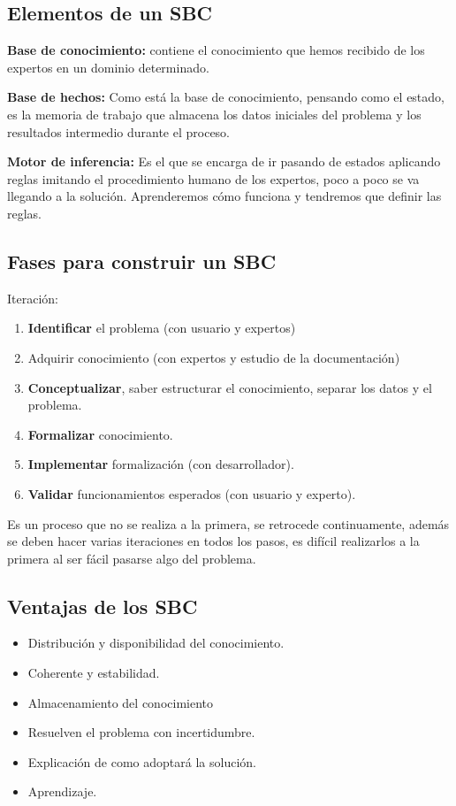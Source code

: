 \documentclass[12pt, twoside, openright]{report} %
\begin{document}
\subsection{Elementos de un SBC}
\textbf{Base de conocimiento:} contiene el conocimiento que hemos recibido de los expertos en un dominio determinado.

\textbf{Base de hechos:} Como está la base de conocimiento, pensando como el estado, es la memoria de trabajo que almacena los datos iniciales del problema y los resultados intermedio durante el proceso.

\textbf{Motor de inferencia:} Es el que se encarga de ir pasando de estados aplicando reglas imitando el procedimiento humano de los expertos, poco a poco se va llegando a la solución. Aprenderemos cómo funciona y tendremos que definir las reglas.
\begin{figure}[H]
  {\def\svgwidth{.8\textwidth}
  }
\end{figure}
\pagebreak

\subsection{Fases para construir un SBC}
Iteración:
\begin{enumerate}
  \item \textbf{Identificar} el problema (con usuario y expertos)
  \item Adquirir conocimiento (con expertos y estudio de la documentación)
  \item \textbf{Conceptualizar}, saber estructurar el conocimiento, separar los datos y el problema.
  \item \textbf{Formalizar} conocimiento.
  \item \textbf{Implementar} formalización (con desarrollador).
  \item \textbf{Validar} funcionamientos esperados (con usuario y experto).
\end{enumerate}

Es un proceso que no se realiza a la primera, se retrocede continuamente, además se deben hacer varias iteraciones en todos los pasos, es difícil realizarlos a la primera al ser fácil pasarse algo del problema.

\subsection{Ventajas de los SBC}
\begin{itemize}
  \item Distribución y disponibilidad del conocimiento.
  \item Coherente y estabilidad.
  \item Almacenamiento del conocimiento
  \item Resuelven el problema con incertidumbre.
  \item Explicación de como adoptará la solución.
  \item Aprendizaje.
\end{itemize}
\end{document}
